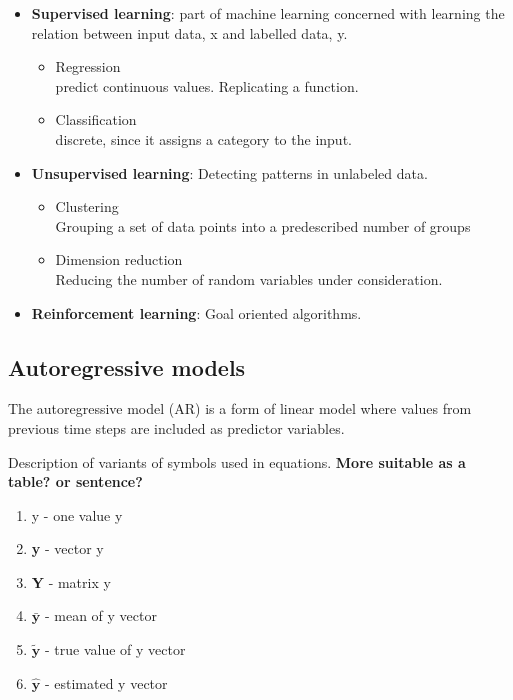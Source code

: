 \documentclass{article}
\begin{document}
\begin{itemize}
    \item \textbf{Supervised learning}: part of machine learning concerned with learning the relation between input data, x and labelled data, y.
    \begin{itemize}
        \item Regression\\predict continuous values. Replicating a function.
        \item Classification\\discrete, since it assigns a category to the input.
    \end{itemize}
    \item \textbf{Unsupervised learning}: Detecting patterns in unlabeled data.
    \begin{itemize}
        \item Clustering\\Grouping a set of data points into a predescribed number of groups
        \item Dimension reduction\\Reducing the number of random variables under consideration.
    \end{itemize}
    \item \textbf{Reinforcement learning}: Goal oriented algorithms.
\end{itemize}

\subsection{Autoregressive models} \label{sec:ARmodels}
The autoregressive model (AR) is a form of linear model where values from previous time steps are included as predictor variables. 

Description of variants of symbols used in equations. \textbf{More suitable as a table? or sentence?}
\begin{enumerate}
    \item y - one value y
    \item \textbf{y} - vector y
    \item \textbf{Y} - matrix y
    \item $\bar{\textbf{y}}$   - mean of y vector
    \item $\tilde{\textbf{y}}$ - true value of y vector 
    \item $\hat{\textbf{y}}$   - estimated y vector
\end{enumerate}
\end{document}
